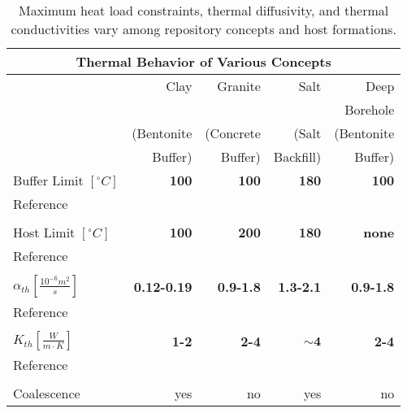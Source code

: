 %
\begin{table}[h!]
  \centering
  \footnotesize{
  \begin{tabular}{|l|r|r|r|r|}
    \multicolumn{5}{c}{\textbf{Thermal Behavior of Various Concepts}}\\
    \hline
            & Clay & Granite & Salt & Deep \\ 
            & & & & Borehole \\ 
            & (Bentonite & (Concrete & (Salt & (Bentonite\\ 
            & Buffer) & Buffer) & Backfill) & Buffer) \\ 
    \hline
    Buffer Limit $[^{\circ}C]$ & \textbf{100}  & \textbf{100}  & \textbf{180} & \textbf{100}  \\ 
    Reference
    & \cite{hardin_generic_2011}   
    & \cite{von_lensa_red-impact_2008}   
    & \cite{von_lensa_red-impact_2008,brewitz_long-term_2002}   
    & \cite{von_lensa_red-impact_2008}  \\ 
    &      &      &     &      \\
    Host Limit $[^{\circ}C]$   & \textbf{100}  & \textbf{200}  & \textbf{180} & \textbf{none} \\ 
    Reference                     
    & \cite{andra_argile:_2005}   
    & \cite{von_lensa_red-impact_2008}   
    & \cite{hardin_generic_2011}   
    & \cite{hardin_generic_2011, brady_deep_2009}   \\
    &      &      &     &      \\
    $\alpha_{th} [\frac{10^{-6}m^2}{s}]$ & \textbf{0.12-0.19} & \textbf{0.9-1.8} & \textbf{1.3-2.1} &\textbf{ 0.9-1.8} \\ 
    Reference                     
    & \cite{tikhonravova_effect_2007} 
    & \cite{durham_thermal_1987,hardin_generic_2011,kim_thermal_2007}     
    & \cite{hardin_generic_2011,nieland_storage_2001}   
    & \cite{durham_thermal_1987,hardin_generic_2011,kim_thermal_2007}   \\ 
    &      &      &     &      \\
    $K_{th} [\frac{W}{m{\cdot}K}]$ & \textbf{1-2} & \textbf{2-4} & $\mathbf{\sim4}$  & \textbf{2-4} \\ 
    Reference                     
    & \cite{hardin_generic_2011,tikhonravova_effect_2007}    
    & \cite{hardin_generic_2011,kim_thermal_2007,surma_porosity_2003,ab_long-term_2006}    
    & \cite{hardin_generic_2011,nieland_storage_2001}
    & \cite{hardin_generic_2011,kim_thermal_2007,surma_porosity_2003}\\ 
    &      &      &     &      \\
    Coalescence & yes & no & yes & no \\ 
    \hline
  \end{tabular}
  \caption[Models for Heat Transport for Various Geologies]{Maximum heat load constraints, thermal 
  diffusivity, and thermal conductivities vary among repository concepts and host formations. }
  \label{tab:heat_tab}
  }
\end{table}
